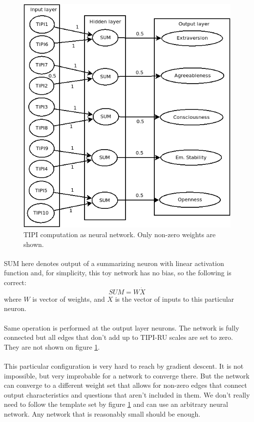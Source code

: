 \documentclass{llncs}
\begin{document}
\begin{figure}[!h]
	\centering
	\includegraphics[width=\textwidth]{figures/TIPIasNN.png}
	\caption{TIPI computation as neural network. Only non-zero weights are shown.}
	\label{fig:fig1}
\end{figure}
\paragraph{}
SUM here denotes output of a summarizing neuron with linear activation function and, for simplicity, this toy network has no bias, so the following is correct: 
\begin{equation}
	SUM = W \dot X
\end{equation}
where $W$ is vector of weights, and $X$ is the vector of inputs to this particular neuron. 
\paragraph{}
Same operation is performed at the output layer neurons. The network is fully connected but all edges that don't add up to TIPI-RU scales are set to zero. They are not shown on figure \ref{fig:fig1}.

\paragraph{}
This particular configuration is very hard to reach by gradient descent. It is not impossible, but very improbable for a network to converge there. But the network can converge to a different weight set that allows for non-zero edges that connect output characteristics and questions that aren't included in them. We don't really need to follow the template set by figure \ref{fig:fig1} and can use an arbitrary neural network. Any network that is reasonably small should be enough. %
\end{document}
